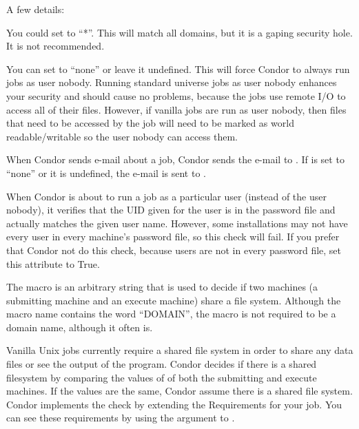 \begin{description}
A few details:

You could set 
to ``*''. This will match all domains,
but it is a gaping security hole. It is not recommended.

You can set 
to ``none'' or leave it undefined. This will
force Condor to always run jobs as user nobody.
Running standard universe jobs as user nobody enhances
your security and should cause no problems, because the jobs use remote
I/O to access all of their files.
However, if vanilla jobs are run as
user nobody, then files that need to be accessed by the job will need
to be marked as world readable/writable so the user nobody can access
them.

When Condor sends e-mail about a job, Condor sends the e-mail to
.
If 
is set to ``none'' or it is undefined, 
the e-mail is
sent to .


\item[\Macro{SOFT\_UID\_DOMAIN}] \label{param:SoftUidDomain}
When Condor is about to run a job as a particular user (instead of the
user nobody), it verifies that the UID given for the user is in the
password file and actually matches the given user name.
However, some
installations may not have every user in every machine's password
file, so this check will fail. If you prefer that Condor not do
this check, because users are not in every password file, set
this attribute to True.



\item[\Macro{FILESYSTEM\_DOMAIN}] \label{param:FilesystemDomain}
The 
macro is an arbitrary string that is used to decide if
two machines (a submitting machine and an execute machine) share a
file system.
Although the macro name contains the word ``DOMAIN'',
the macro is not required to be a domain name, although it often is.

Vanilla Unix jobs currently require a shared file system in order to
share any data files or see the output of the program.
Condor decides if there is a shared filesystem by comparing the values
of 
of both the submitting and execute machines.
If the values are the same,
Condor assume there is a shared file system.
Condor implements the check
by extending the Requirements for your job.
You can see these requirements by using the  argument
to .


\end{description}
